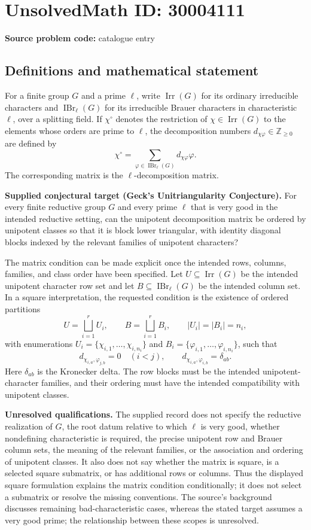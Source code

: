 \documentclass[11pt]{article}
\begin{document}
\section*{UnsolvedMath ID: 30004111}
\textbf{Source problem code:} catalogue entry
\subsection{Definitions and mathematical statement}
For a finite group \(G\) and a prime \(\ell\), write \(\operatorname{Irr}(G)\) for its ordinary irreducible characters and \(\operatorname{IBr}_{\ell}(G)\) for its irreducible Brauer characters in characteristic \(\ell\), over a splitting field. If \(\chi^{\circ}\) denotes the restriction of \(\chi\in\operatorname{Irr}(G)\) to the elements whose orders are prime to \(\ell\), the decomposition numbers \(d_{\chi\varphi}\in\mathbb Z_{\geq 0}\) are defined by
\[
\chi^{\circ}=\sum_{\varphi\in\operatorname{IBr}_{\ell}(G)}d_{\chi\varphi}\varphi.
\]
The corresponding matrix is the \(\ell\)-decomposition matrix.

\textbf{Supplied conjectural target (Geck's Unitriangularity Conjecture).} For every finite reductive group \(G\) and every prime \(\ell\) that is very good in the intended reductive setting, can the unipotent decomposition matrix be ordered by unipotent classes so that it is block lower triangular, with identity diagonal blocks indexed by the relevant families of unipotent characters?

The matrix condition can be made explicit once the intended rows, columns, families, and class order have been specified. Let \(U\subseteq\operatorname{Irr}(G)\) be the intended unipotent character row set and let \(B\subseteq\operatorname{IBr}_{\ell}(G)\) be the intended column set. In a square interpretation, the requested condition is the existence of ordered partitions
\[
U=\bigsqcup_{i=1}^{r}U_i,\qquad
B=\bigsqcup_{i=1}^{r}B_i,\qquad
|U_i|=|B_i|=n_i,
\]
with enumerations \(U_i=\{\chi_{i,1},\ldots,\chi_{i,n_i}\}\) and \(B_i=\{\varphi_{i,1},\ldots,\varphi_{i,n_i}\}\), such that
\[
d_{\chi_{i,a},\varphi_{j,b}}=0\quad(i<j),
\qquad
d_{\chi_{i,a},\varphi_{i,b}}=\delta_{ab}.
\]
Here \(\delta_{ab}\) is the Kronecker delta. The row blocks must be the intended unipotent-character families, and their ordering must have the intended compatibility with unipotent classes.

\textbf{Unresolved qualifications.} The supplied record does not specify the reductive realization of \(G\), the root datum relative to which \(\ell\) is very good, whether nondefining characteristic is required, the precise unipotent row and Brauer column sets, the meaning of the relevant families, or the association and ordering of unipotent classes. It also does not say whether the matrix is square, is a selected square submatrix, or has additional rows or columns. Thus the displayed square formulation explains the matrix condition conditionally; it does not select a submatrix or resolve the missing conventions. The source's background discusses remaining bad-characteristic cases, whereas the stated target assumes a very good prime; the relationship between these scopes is unresolved.
\end{document}
